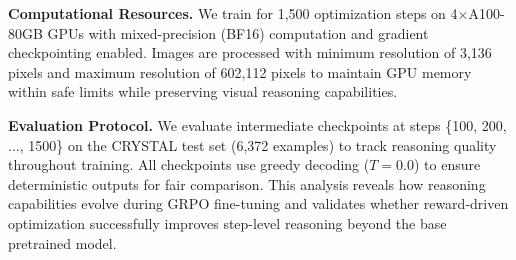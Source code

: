 \textbf{Computational Resources.}
We train for 1,500 optimization steps on 4$\times$A100-80GB GPUs with mixed-precision (BF16) computation and gradient checkpointing enabled. Images are processed with minimum resolution of 3,136 pixels and maximum resolution of 602,112 pixels to maintain GPU memory within safe limits while preserving visual reasoning capabilities.

\textbf{Evaluation Protocol.}
We evaluate intermediate checkpoints at steps \{100, 200, ..., 1500\} on the CRYSTAL test set (6,372 examples) to track reasoning quality throughout training. All checkpoints use greedy decoding ($T=0.0$) to ensure deterministic outputs for fair comparison. This analysis reveals how reasoning capabilities evolve during GRPO fine-tuning and validates whether reward-driven optimization successfully improves step-level reasoning beyond the base pretrained model.
